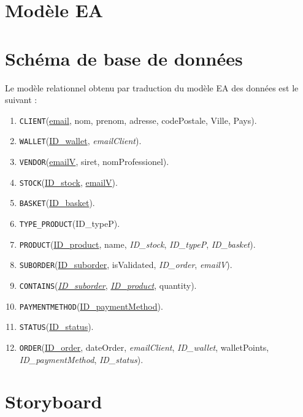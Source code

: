 \documentclass[a4paper,12pt]{book}
\theoremstyle{break}
\theoremstyle{break}
\theoremstyle{break}
\theoremstyle{break}
\theoremstyle{definition}
\theoremstyle{remark}
\begin{document}
\section{Modèle EA}

\section{Schéma de base de données}
Le modèle relationnel obtenu par traduction du modèle EA des données est le suivant :
\begin{enumerate}
  \item{\texttt{CLIENT}(\underline{email}, nom, prenom, adresse, codePostale, Ville, Pays).}
  \item{\texttt{WALLET}(\underline{ID\_wallet}, \textit{emailClient}).}
  \item{\texttt{VENDOR}(\underline{emailV}, siret, nomProfessionel).}
  \item{\texttt{STOCK}(\underline{ID\_stock}, \underline{emailV}).}
  \item{\texttt{BASKET}(\underline{ID\_basket}).}
  \item{\texttt{TYPE\_PRODUCT}(ID\_typeP).}
  \item{\texttt{PRODUCT}(\underline{ID\_product}, name, \textit{ID\_stock}, \textit{ID\_typeP}, \textit{ID\_basket}).}
  \item{\texttt{SUBORDER}(\underline{ID\_suborder}, isValidated, \textit{ID\_order}, \textit{emailV}).}
  \item{\texttt{CONTAINS}(\underline{\textit{ID\_suborder}}, \underline{\textit{ID\_product}}, quantity).}
  \item{\texttt{PAYMENTMETHOD}(\underline{ID\_paymentMethod}).}
  \item{\texttt{STATUS}(\underline{ID\_status}).}
  \item{\texttt{ORDER}(\underline{ID\_order}, dateOrder, \textit{emailClient}, \textit{ID\_wallet}, walletPoints, \textit{ID\_paymentMethod}, \textit{ID\_status}).}
\end{enumerate}

\section{Storyboard}
\end{document}
